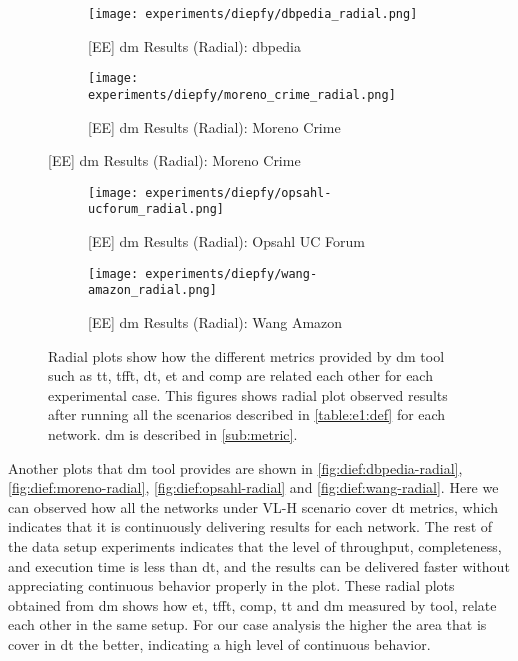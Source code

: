 \begin{figure}[!htb]
  \centering
  \begin{subfigure}{0.5\textwidth}
  \texttt{[image: experiments/diepfy/dbpedia\_radial.png]}
    \caption{{[EE] \acrshort{dm} Results (Radial): \acrshort{dbpedia}}}
    \label{fig:dief:dbpedia-radial}
  \end{subfigure}%
  \begin{subfigure}{0.5\textwidth}
  \texttt{[image: experiments/diepfy/moreno\_crime\_radial.png]}
    \caption{{[EE] \acrshort{dm} Results (Radial): Moreno Crime}}
    \label{fig:dief:moreno-radial}
  \end{subfigure}
\end{figure}
%
\begin{figure}[!htb]
  \centering
  \begin{subfigure}{0.5\textwidth}
  \texttt{[image: experiments/diepfy/opsahl-ucforum\_radial.png]}
    \caption{{[EE] \acrshort{dm} Results (Radial): Opsahl UC Forum}}
    \label{fig:dief:opsahl-radial}
  \end{subfigure}%
  \begin{subfigure}{0.5\textwidth}
    \texttt{[image: experiments/diepfy/wang-amazon\_radial.png]}
    \caption{{[EE] \acrshort{dm} Results (Radial): Wang Amazon}}
    \label{fig:dief:wang-radial}
  \end{subfigure}
  \caption[{[EE] \acrshort{dm} General Results (Radial)}]{Radial plots show how the different metrics provided by \acrshort{dm} tool such as \acrfull{tt}, \acrfull{tfft}, \acrfull{dt}, \acrfull{et} and \acrfull{comp} are related each other for each experimental case. This figures shows radial plot observed results after running all the scenarios described in \autoref{table:e1:def} for each network. \acrshort{dm} is described in \autoref{sub:metric}.}
\end{figure}

Another plots that \acrshort{dm} tool provides are shown in \autoref{fig:dief:dbpedia-radial}, \autoref{fig:dief:moreno-radial}, \autoref{fig:dief:opsahl-radial} and \autoref{fig:dief:wang-radial}.
Here we can observed how all the networks under VL-H scenario cover \acrshort{dt} metrics, which indicates that it is continuously delivering results for each network. 
The rest of the data setup experiments indicates that the level of throughput, completeness, and execution time is less than \acrfull{dt}, and the results can be delivered faster without appreciating continuous behavior properly in the plot. 
These radial plots obtained from \acrshort{dm} shows how \acrfull{et}, \acrfull{tfft}, \acrfull{comp}, \acrfull{tt} and \acrshort{dm} measured by tool, relate each other in the same setup. 
For our case analysis the higher the area that is cover in \acrfull{dt} the better, indicating a high level of continuous behavior.

